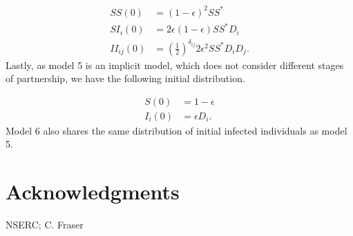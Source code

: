 \documentclass[10pt,letterpaper]{article}
\newcommand{\khalf}{\left(\frac{1}{2}\right)^{\delta_{ij}}}  %
\begin{document}
\begin{equation}
\begin{aligned}
SS(0) &= (1 - \epsilon)^2 SS^*\\
SI_i(0) &= 2 \epsilon (1-\epsilon) SS^* D_i\\
II_{ij}(0) &=  \khalf 2\epsilon^2 SS^* D_i D_j.
\end{aligned}
\end{equation}
Lastly, as model 5 is an implicit model, which does not consider different stages of partnership, we have the following initial distribution.

\begin{equation}
\begin{aligned}
S(0) &= 1 - \epsilon\\
I_i(0) &=  \epsilon D_i.
\end{aligned}
\end{equation}
Model 6 also shares the same distribution of initial infected individuals as model 5.

\section*{Acknowledgments}
NSERC; C. Fraser

\nolinenumbers

%
%
% 


\end{document}
